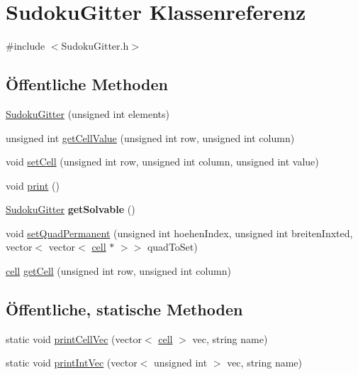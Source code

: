 \hypertarget{class_sudoku_gitter}{\section{Sudoku\-Gitter Klassenreferenz}
\label{class_sudoku_gitter}
}


{\ttfamily \#include $<$Sudoku\-Gitter.\-h$>$}

\subsection*{Öffentliche Methoden}
\begin{DoxyCompactItemize}
\item 
\hyperlink{class_sudoku_gitter_ad3443d5846cba4cef8fdfebc46f16c0b}{Sudoku\-Gitter} (unsigned int elements)
\item 
unsigned int \hyperlink{class_sudoku_gitter_aedc91eeba50722d3b4deb0609a27aedf}{get\-Cell\-Value} (unsigned int row, unsigned int column)
\item 
void \hyperlink{class_sudoku_gitter_aa7fa54638ade311994bd8f6433df8ff0}{set\-Cell} (unsigned int row, unsigned int column, unsigned int value)
\item 
void \hyperlink{class_sudoku_gitter_a771332a8a5eff5e1917538adfb237d0e}{print} ()
\item 
\hypertarget{class_sudoku_gitter_ad089a50f3435a3eb025aacab74b8fbed}{\hyperlink{class_sudoku_gitter}{Sudoku\-Gitter} {\bfseries get\-Solvable} ()}\label{class_sudoku_gitter_ad089a50f3435a3eb025aacab74b8fbed}

\item 
void \hyperlink{class_sudoku_gitter_a2bb7fd934b5b87646bb09b01e80fea8b}{set\-Quad\-Permanent} (unsigned int hoehen\-Index, unsigned int breiten\-Inxted, vector$<$ vector$<$ \hyperlink{structcell}{cell} $\ast$ $>$$>$ quad\-To\-Set)
\item 
\hyperlink{structcell}{cell} \hyperlink{class_sudoku_gitter_a4264ea5ac6602a4b7dd6cdaf7c98f28f}{get\-Cell} (unsigned int row, unsigned int column)
\end{DoxyCompactItemize}
\subsection*{Öffentliche, statische Methoden}
\begin{DoxyCompactItemize}
\item 
static void \hyperlink{class_sudoku_gitter_a8bbf319c21d2cd6111d36082d3abf78d}{print\-Cell\-Vec} (vector$<$ \hyperlink{structcell}{cell} $>$ vec, string name)
\item 
static void \hyperlink{class_sudoku_gitter_a8496c0d45f5a35e97703787c6756330b}{print\-Int\-Vec} (vector$<$ unsigned int $>$ vec, string name)
\end{DoxyCompactItemize}
